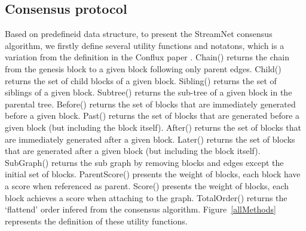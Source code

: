 



\subsection{Consensus protocol}
Based on predefineid data structure, to present the StreamNet consensus algorithm, 
we firstly define several utility functions and notatons, which is a variation from the definition in the Conflux paper \cite{li2018scaling}. 
Chain() returns the chain from the genesis block to a given block following only parent edges. 
Child() returns the set of child blocks of a given block. 
Sibling() returns the set of siblings of a given block. 
Subtree() returns the sub-tree of a given block in the parental tree. 
Before() returns the set of blocks that are immediately generated before a given block. 
Past() returns the set of blocks that are generated before a given block (but including the block itself).
After() returns the set of blocks that are immediately generated after a given block. 
Later() returns the set of blocks that are generated after a given block (but including the block itself).
SubGraph() returns the sub graph by removing blocks and edges except the initial set of blocks.
ParentScore() presents the weight of blocks, each block have a score when referenced as parent. 
Score() presents the weight of blocks, each block achieves a score when attaching to the graph. 
TotalOrder() returns the `flattend' order infered from the consensus algorithm.
Figure~\ref{allMethods} represents the definition of these utility functions. 

